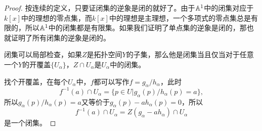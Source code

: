 \begin{proof}
	按连续的定义，只要证闭集的逆象是闭的就好了。由于$\mathbb{A}^1$中的闭集对应于$k[x]$中的理想的零点集，而$k[x]$中的理想是主理想，一个多项式的零点集总是有限的，所以$\mathbb{A}^1$中的闭集都是有限集。如果我们证明了单点集的逆象是闭的，那也就证明了所有闭集的逆象是闭的。

	闭集可以局部检查，如果$Z$是拓扑空间$Y$的子集，那么他是闭集当且仅当对于任意一个$Y$的开覆盖$\{U_\alpha\}$，$Z\cap U_\alpha$是$U_\alpha$中的闭集。

	找个开覆盖，在每个$U_\alpha$中，$f$都可以写作$f=g_\alpha/h_\alpha$，此时
	\[
		f^{-1}(a)\cap U_\alpha=\bigl\{p\in U| g_\alpha(p)/h_\alpha(p)=a\bigr\},
	\]
	所以$g_\alpha(p)/h_\alpha(p)=a$又等价于$g_\alpha(p)-ah_\alpha(p)=0$，所以
	\[
		f^{-1}(a)\cap U_\alpha=Z(g_\alpha-ah_\alpha)\cap U_\alpha
	\]
	是一个闭集。
\end{proof}